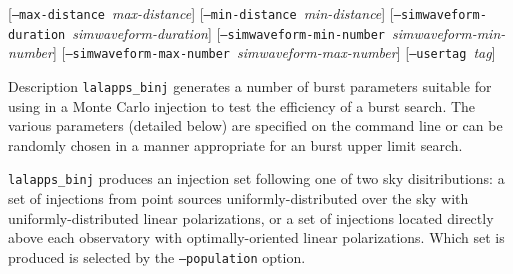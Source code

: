 \documentclass[10pt]{article}
\newcommand{\prog}[1]{\texttt{#1}}
\newcommand{\option}[1]{\texttt{#1}}
\newcommand{\parm}[1]{\textit{#1}}
\newenvironment{entry}%
{\begin{list}{}{\renewcommand{\makelabel}[1]%
{\parbox[b]{\labelwidth}{\makebox[0pt][l]{\textbf{##1}}\\}}%
\setlength{\labelwidth}{1em}%
\setlength{\labelsep}{1em}%
\setlength{\leftmargin}{2em}%
\setlength{\topsep}{\medskipamount}%
\setlength{\itemsep}{\medskipamount}%
\setlength{\parsep}{\medskipamount}%
\setlength{\listparindent}{0pt}}}
{\end{list}}
\begin{document}
\begin{entry}
[\option{--max-distance}~\parm{max-distance}] \newline \hspace*{0.5in}
[\option{--min-distance}~\parm{min-distance}] \newline \hspace*{0.5in}
[\option{--simwaveform-duration}~\parm{simwaveform-duration}] \newline \hspace*{0.5in}
[\option{--simwaveform-min-number}~\parm{simwaveform-min-number}] \newline \hspace*{0.5in}
[\option{--simwaveform-max-number}~\parm{simwaveform-max-number}] \newline \hspace*{0.5in}
[\option{--usertag}~\parm{tag}]

\item[Description] 
\prog{lalapps\_binj} generates a number of burst parameters suitable for
using in a Monte Carlo injection to test the efficiency of a burst search.
The various parameters (detailed below) are specified on the command line
or can be randomly chosen in a manner appropriate for an burst upper limit
search.

\prog{lalapps\_binj} produces an injection set following one of two sky
disitributions:  a set of injections from point sources
uniformly-distributed over the sky with uniformly-distributed linear
polarizations, or a set of injections located directly above each
observatory with optimally-oriented linear polarizations.  Which set is
produced is selected by the \option{--population} option.


\end{entry}
\end{document}
